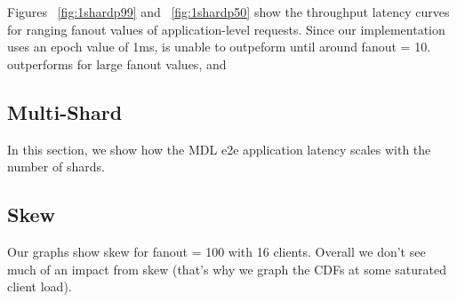 Figures ~\ref{fig:1shardp99} and ~\ref{fig:1shardp50} show the throughput latency curves for ranging fanout values of application-level requests. Since our implementation uses an epoch value of 1ms, \system is unable to outpeform \mpaxos until around fanout = 10. \system outperforms \mpaxos for large fanout values, and 



\subsection{Multi-Shard}
\label{sec:shards}
In this section, we show how the MDL e2e application latency scales with the number of shards. 


\subsection{Skew}

Our graphs show skew for fanout = 100 with 16 clients. Overall we don't see much of an impact from skew (that's why we graph the CDFs at some saturated client load).

